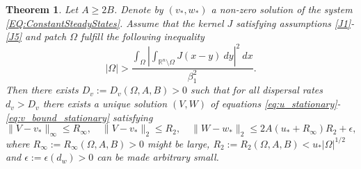 \documentclass[11pt, a4paper]{article}
\theoremstyle{break}
\newtheorem{thm}{Theorem}[section]
\theoremstyle{break}
\theoremstyle{break}
\theoremstyle{break}
\theoremstyle{break}
\theoremstyle{break}
\theoremstyle{break}
\begin{document}
\begin{thm}
    \label{thm:Stationary-Solutions-Existence}
    Let $A \geq 2B$. Denote by $(v_*, w_*)$ a non-zero solution of the system \eqref{EQ:ConstantSteadyStates}. Assume that the kernel $J$ satisfying assumptions \ref{J1}-\ref{J5} and patch $\Omega$ fulfill the following inequality
    \begin{equation}
        \label{eq:assumption_kernel_domain}
        |\Omega| > \frac{\int_\Omega\left|\int_{\mathbb{R}^n\setminus\Omega} J(x-y)\:dy \right|^2\:dx}{\beta_1^2}.
    \end{equation}
    Then there exists $D_v := D_v(\Omega, A, B) > 0$ such that for all dispersal rates $d_v > D_v$ there exists a unique solution $(V, W)$ of equations \eqref{eq:u_stationary}-\eqref{eq:v_bound_stationary} satisfying
    \begin{equation}
        \|V - v_*\|_\infty \leq R_\infty, \quad \|V - v_*\|_2 \leq R_2, \quad \|W - w_*\|_2 \leq 2A(u_* + R_\infty) R_2 + \epsilon,
    \end{equation}
    where $R_\infty := R_\infty(\Omega, A, B) > 0$ might be large, $R_2 := R_2(\Omega, A, B) < u_* |\Omega|^{1/2}$ and $\epsilon := \epsilon(d_w) > 0$ can be made arbitrary small.
\end{thm}
\end{document}
